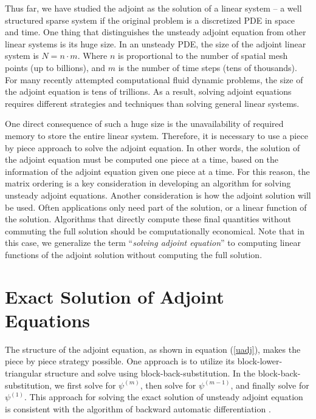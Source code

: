 \documentclass{elsart}
\theoremstyle{remark}
\theoremstyle{definition}
\theoremstyle{proof}
\begin{document}
    Thus far, we have studied the adjoint as the solution of a linear
    system -- a well structured sparse system if the original problem is
    a discretized PDE in space and time.  One thing that distinguishes the
    unsteady adjoint equation from other linear systems is its huge size.
    In an unsteady PDE, the size of the adjoint linear system is
    $N = n \cdot m$.  Where $n$ is proportional to the number of spatial
    mesh points (up to billions), and $m$ is the number of time steps
    (tens of thousands).  For many recently attempted computational fluid
    dynamic problems, the size of the adjoint equation is tens of trillions.
    As a result, solving adjoint equations requires different strategies
    and techniques than solving general linear systems.
    
    One direct consequence of such a huge size is the unavailability of
    required memory to store the entire linear system.  Therefore, it is
    necessary to use a piece by piece approach to solve the adjoint equation.
    In other words, the solution of the adjoint equation must be computed one
    piece at a time, based on the information of the adjoint equation
    given one piece at a time.  For this reason, the matrix ordering is a key
    consideration in developing an algorithm for solving unsteady adjoint
    equations.  Another consideration is how the adjoint solution will be
    used.  Often applications only need part of the solution, or a linear
    function of the solution.  Algorithms that directly compute these
    final quantities without commuting the full solution should be
    computationally economical.  Note that in this case, we generalize the term
    ``\emph{solving adjoint equation}'' to computing linear functions of the
    adjoint solution without computing the full solution.





\section{Exact Solution of Adjoint Equations}
    The structure of the adjoint equation, as shown in equation
    (\ref{uadj}), makes the piece by piece strategy possible.  One
    approach is to utilize its block-lower-triangular structure and
    solve using block-back-substitution.  In the block-back-substitution,
    we first solve for $\psi^{(m)}$, then solve for $\psi^{(m-1)}$, and
    finally solve for $\psi^{(1)}$.  This approach for solving the exact
    solution of unsteady adjoint equation is consistent with the
    algorithm of backward automatic differentiation \cite{Griewank2003}.
    
\end{document}
